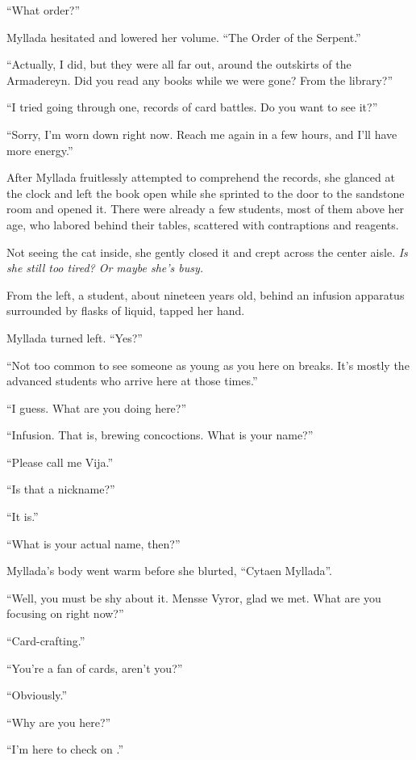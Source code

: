 ``What order?''

Myllada hesitated and lowered her volume. ``The Order of the Serpent.''

``Actually, I did, but they were all far out, around the outskirts of the Armadereyn. Did you read any books while we were gone? From the library?''

``I tried going through one, records of card battles. Do you want to see it?''

``Sorry, I'm worn down right now. Reach me again in a few hours, and I'll have more energy.''

\centeredstars

After Myllada fruitlessly attempted to comprehend the records, she glanced at the clock and left the book open while she sprinted to the door to the sandstone room and opened it. There were already a few students, most of them above her age, who labored behind their tables, scattered with contraptions and reagents.

Not seeing the cat inside, she gently closed it and crept across the center aisle. \emph{Is she still too tired? Or maybe she's busy.}

From the left, a student, about nineteen years old, behind an infusion apparatus surrounded by flasks of liquid, tapped her hand.

Myllada turned left. ``Yes?''

``Not too common to see someone as young as you here on breaks. It's mostly the advanced students who arrive here at those times.''

``I guess. What are you doing here?''

``Infusion. That is, brewing concoctions. What is your name?''

``Please call me Vija.''

``Is that a nickname?''

``It is.''

``What is your actual name, then?''

Myllada's body went warm before she blurted, ``Cytaen Myllada''.

``Well, you must be shy about it. Mensse Vyror, glad we met. What are you focusing on right now?''

``Card-crafting.''

``You're a fan of cards, aren't you?''

``Obviously.''

``Why are you here?''

``I'm here to check on \yronsyncra.''

